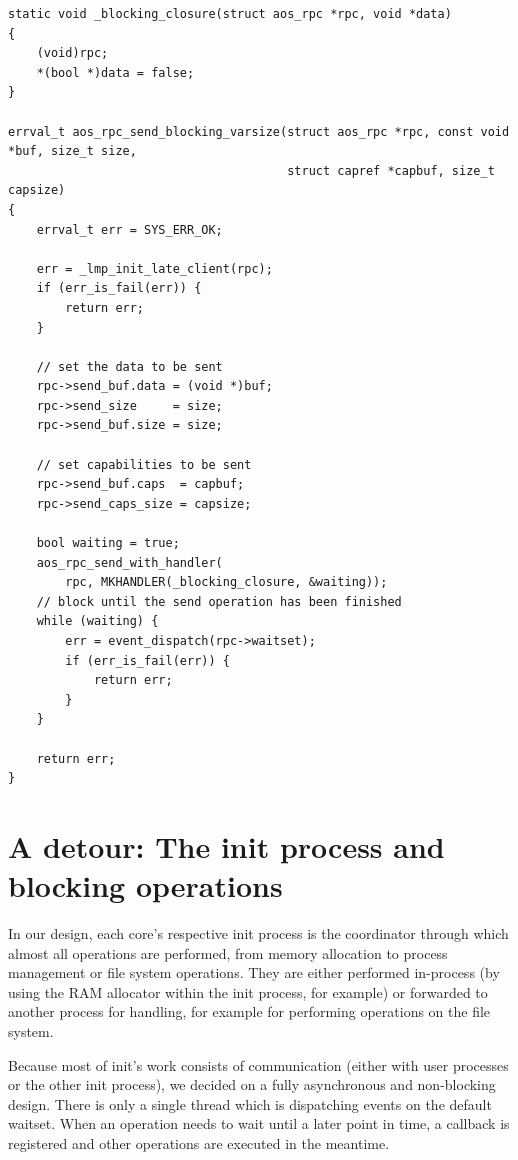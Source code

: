 \begin{lstlisting}[caption={Using \texttt{aos\_rpc\_send\_with\_handler} for a blocking send implementation},label={listing:sendblocking}]
static void _blocking_closure(struct aos_rpc *rpc, void *data)
{
    (void)rpc;
    *(bool *)data = false;
}

errval_t aos_rpc_send_blocking_varsize(struct aos_rpc *rpc, const void *buf, size_t size,
                                       struct capref *capbuf, size_t capsize)
{
    errval_t err = SYS_ERR_OK;

    err = _lmp_init_late_client(rpc);
    if (err_is_fail(err)) {
        return err;
    }

    // set the data to be sent
    rpc->send_buf.data = (void *)buf;
    rpc->send_size     = size;
    rpc->send_buf.size = size;

    // set capabilities to be sent
    rpc->send_buf.caps  = capbuf;
    rpc->send_caps_size = capsize;

    bool waiting = true;
    aos_rpc_send_with_handler(
        rpc, MKHANDLER(_blocking_closure, &waiting));
    // block until the send operation has been finished
    while (waiting) {
        err = event_dispatch(rpc->waitset);
        if (err_is_fail(err)) {
            return err;
        }
    }

    return err;
}
\end{lstlisting}

\section{A detour: The init process and blocking operations}
\label{section:rpc:initnoblock}
In our design, each core's respective init process is the coordinator through which almost all operations are performed, from memory allocation to process management or file system operations. They are either performed in-process (by using the RAM allocator within the init process, for example) or forwarded to another process for handling, for example for performing operations on  the file system.

Because most of init's work consists of communication (either with user processes or the other init process), we decided on a fully asynchronous and non-blocking design. There is only a single thread which is dispatching events on the default waitset. When an operation needs to wait until a later point in time, a callback is registered and other operations are executed in the meantime.

